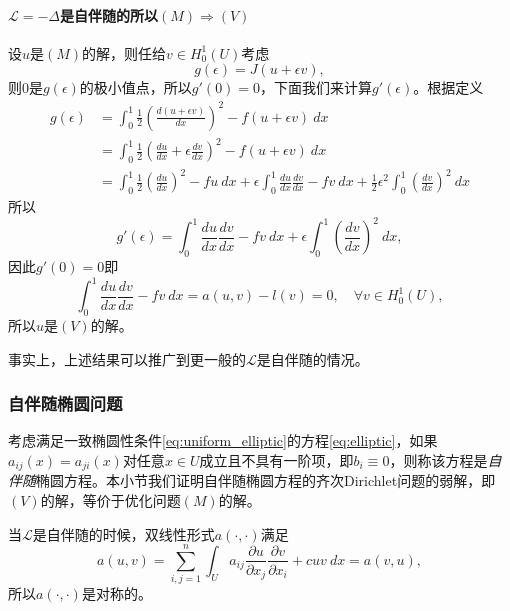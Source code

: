 \documentclass[a4paper,10pt]{ctexart}
\begin{document}
\paragraph*{$ \mathcal{L} = -\Delta $是自伴随的所以$ (M)\Rightarrow (V) $} 设$ u $是$ (M) $的解，则任给$ v\in H^1_0(U) $考虑
\[
    g(\epsilon) = J(u+\epsilon v),
\]
则$ 0 $是$ g(\epsilon) $的极小值点，所以$ g'(0) = 0 $，下面我们来计算$ g'(\epsilon) $。根据定义
\[
    \begin{aligned}
        g(\epsilon) 
        &= \int_0^1 \frac{1}{2}(\frac{d(u+\epsilon v)}{dx})^2 - f(u+\epsilon v)\ dx\\
        &= \int_0^1 \frac{1}{2}(\frac{du}{dx}+\epsilon\frac{dv}{dx})^2 - f(u+\epsilon v)\ dx\\
        &= \int_0^1 \frac{1}{2}(\frac{du}{dx})^2 -fu\ dx + \epsilon\int_0^1\frac{du}{dx}\frac{dv}{dx}-fv\ dx + \frac{1}{2}\epsilon^2\int_0^1(\frac{dv}{dx})^2 \ dx
    \end{aligned}
\]
所以
\[
    g'(\epsilon) = \int_0^1 \frac{du}{dx}\frac{dv}{dx}-fv\ dx + \epsilon\int_0^1(\frac{dv}{dx})^2\ dx,
\]
因此$ g'(0)=0 $即
\[
    \int_0^1 \frac{du}{dx}\frac{dv}{dx}-fv\ dx = a(u,v) - l(v) = 0,\quad \forall v\in H^1_0(U),  
\]
所以$ u $是$ (V) $的解。

事实上，上述结果可以推广到更一般的$ \mathcal{L} $是自伴随的情况。

\subsubsection{自伴随椭圆问题}
考虑满足一致椭圆性条件\eqref{eq:uniform_elliptic}的方程\eqref{eq:elliptic}，如果$ a_{ij}(x) = a_{ji}(x) $对任意$ x\in U $成立且不具有一阶项，即$ b_i\equiv 0 $，则称该方程是\emph{自伴随}椭圆方程。本小节我们证明自伴随椭圆方程的齐次Dirichlet问题的弱解，即$ (V) $的解，等价于优化问题$ (M) $的解。

当$ \mathcal{L} $是自伴随的时候，双线性形式$ a(\cdot,\cdot) $满足
\[
    a(u,v) = \sum_{i,j=1}^n \int_U a_{ij}\frac{\partial u}{\partial x_j}\frac{\partial v}{\partial x_i} + cuv\ d x = a(v,u),
\]
所以$ a(\cdot,\cdot) $是对称的。
\end{document}
